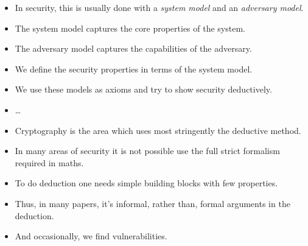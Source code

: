 \begin{frame}
  \begin{itemize}
    \item In security, this is usually done with a \emph{system model} and an 
      \emph{adversary model}.
  \end{itemize}

  \pause

  \begin{definition}
    \begin{itemize}
      \item The system model captures the core properties of the system.
      \item The adversary model captures the capabilities of the adversary.
    \end{itemize}
  \end{definition}

  \pause

  \begin{itemize}
    \item We define the security properties in terms of the system model.
    \item We use these models as axioms and try to show security deductively.
  \end{itemize}
\end{frame}

\begin{frame}
  \begin{example}
    \begin{itemize}
      \item \dots
    \end{itemize}
  \end{example}
\end{frame}

\begin{frame}
  \begin{remark}
    \begin{itemize}
      \item Cryptography is the area which uses most stringently the deductive 
        method.
      \item In many areas of security it is not possible use the full strict 
        formalism required in maths.
      \item To do deduction one needs simple building blocks with few 
        properties.
      \item Thus, in many papers, it's informal, rather than, formal arguments 
        in the deduction.
      \item And occasionally, we find vulnerabilities.
    \end{itemize}
  \end{remark}
\end{frame}


